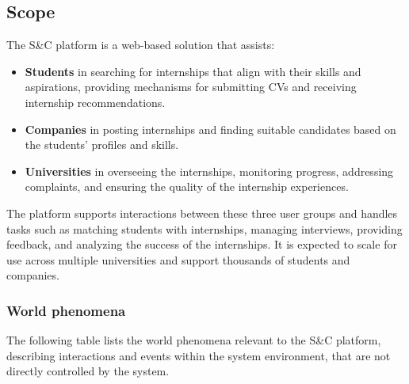 \subsection{Scope}
The S\&C platform is a web-based solution that assists:
\begin{itemize}
    \item \textbf{Students} in searching for internships that align with their skills and aspirations, providing mechanisms for submitting CVs and receiving internship recommendations.
    \item \textbf{Companies} in posting internships and finding suitable candidates based on the students’ profiles and skills.
    \item \textbf{Universities} in overseeing the internships, monitoring progress, addressing complaints, and ensuring the quality of the internship experiences.
\end{itemize}
The platform supports interactions between these three user groups and handles tasks such as matching students with internships, managing interviews, providing feedback, and analyzing the success of the internships. It is expected to scale for use across multiple universities and support thousands of students and companies.
\newpage


\subsubsection{World phenomena}

The following table lists the world phenomena relevant to the S\&C platform, describing interactions and events within the system environment, that are not directly controlled by the system.


